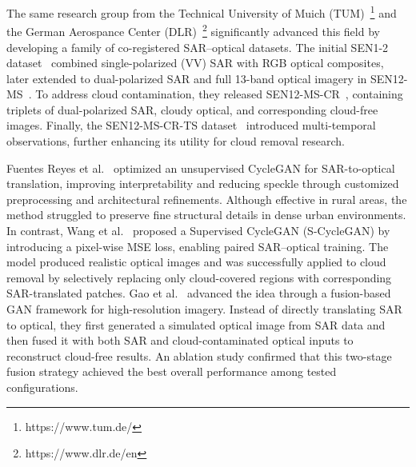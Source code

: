 The same research group from the Technical University of Muich (TUM)~\footnote{https://www.tum.de/} and the German Aerospance Center (DLR)~\footnote{https://www.dlr.de/en} significantly advanced this field by developing a family of co-registered SAR–optical datasets. The initial SEN1-2 dataset~\cite{sen12_2018} combined single-polarized (VV) SAR with RGB optical composites, later extended to dual-polarized SAR and full 13-band optical imagery in SEN12-MS~\cite{sen12ms_2019}. To address cloud contamination, they released SEN12-MS-CR~\cite{sen12ms-cr_2021}, containing triplets of dual-polarized SAR, cloudy optical, and corresponding cloud-free images. Finally, the SEN12-MS-CR-TS dataset~\cite{sen12ms-cr-ts_2022} introduced multi-temporal observations, further enhancing its utility for cloud removal research.

Fuentes Reyes et al.~\cite{sar2opt_cGAN_Optim_oppr_limits} optimized an unsupervised CycleGAN for SAR-to-optical translation, improving interpretability and reducing speckle through customized preprocessing and architectural refinements. Although effective in rural areas, the method struggled to preserve fine structural details in dense urban environments. In contrast, Wang et al.~\cite{s2ot_s_cycle_adv} proposed a Supervised CycleGAN (S-CycleGAN) by introducing a pixel-wise MSE loss, enabling paired SAR–optical training. The model produced realistic optical images and was successfully applied to cloud removal by selectively replacing only cloud-covered regions with corresponding SAR-translated patches.
Gao et al.~\cite{cr_fuse_HR_GEN} advanced the idea through a fusion-based GAN framework for high-resolution imagery. Instead of directly translating SAR to optical, they first generated a simulated optical image from SAR data and then fused it with both SAR and cloud-contaminated optical inputs to reconstruct cloud-free results. An ablation study confirmed that this two-stage fusion strategy achieved the best overall performance among tested configurations.

